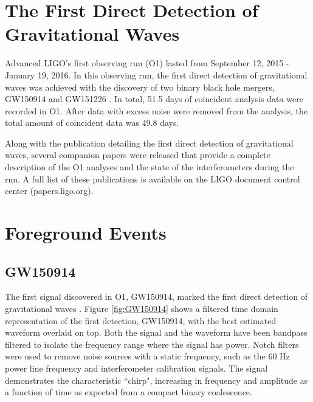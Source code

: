 \section{The First Direct Detection of Gravitational Waves}

Advanced LIGO's first observing run (O1) lasted from September 12, 2015 - 
January 19, 2016. In this observing run, the first direct detection of 
gravitational waves was achieved with the discovery of two binary black 
hole mergers, GW150914 and GW151226 \cite{GW150914-DETECTION,GW151226}. 
In total, 51.5 days of coincident analysis data were recorded in O1. 
After data with excess noise were removed from the analysis, the 
total amount of coincident data was 49.8 days.

Along with the publication detailing the first direct detection of 
gravitational waves, several companion papers were released 
that provide a complete description of the O1 analyses and the state 
of the interferometers during the run. A full list of these 
publications is available on the LIGO document control center 
(papers.ligo.org). 

\section{Foreground Events}

\subsection{GW150914}

The first signal discovered in O1, GW150914, marked the first 
direct detection of gravitational waves \cite{GW150914-DETECTION}.
Figure \ref{fig:GW150914} shows a 
filtered time domain representation of the first detection, 
GW150914, with the best estimated 
waveform overlaid on top. Both the signal and the waveform have been 
bandpass filtered to isolate the frequency range where the signal has 
power. Notch filters were used to remove noise sources with a static 
frequency, such as the 60 Hz power line frequency and 
interferometer calibration signals. 
The signal demonstrates the characteristic ``chirp", 
increasing in frequency and amplitude as a function of time as  
expected from a compact binary coalescence. 

